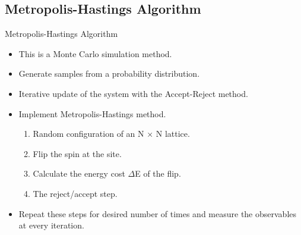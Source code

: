 \documentclass{beamer}
\begin{document}
\subsection{Metropolis-Hastings Algorithm}
\begin{frame}{Metropolis-Hastings Algorithm}
    \begin{itemize}
        \item This is a Monte Carlo simulation method. 
        \item Generate samples from a probability distribution.
        \item Iterative update of the system with the Accept-Reject method.
        \item Implement Metropolis-Hastings method.
        \begin{enumerate}
            \item Random configuration of an N × N lattice.
            \item  Flip the spin at the site.
            \item Calculate the energy cost $\Delta$E of the flip.
            \item The reject/accept step.
        \end{enumerate}
        \item Repeat these steps for desired number of times and measure the observables at every iteration.
    \end{itemize}
\end{frame}
\end{document}
